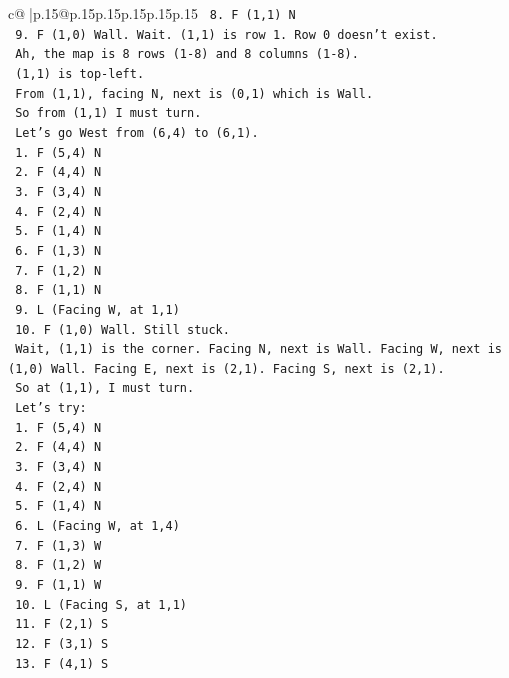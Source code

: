 \documentclass{article}
\begin{document}
{\begin{supertabular}{c@{$\;$}|p{.15\linewidth}@{}p{.15\linewidth}p{.15\linewidth}p{.15\linewidth}p{.15\linewidth}p{.15\linewidth}}
{{{\texttt{    8. F (1,1) N} \\
\texttt{    9. F (1,0) Wall. Wait. (1,1) is row 1. Row 0 doesn't exist.} \\
\texttt{    Ah, the map is 8 rows (1{-}8) and 8 columns (1{-}8).} \\
\texttt{    (1,1) is top{-}left.} \\
\texttt{    From (1,1), facing N, next is (0,1) which is Wall.} \\
\texttt{    So from (1,1) I must turn.} \\
\texttt{    Let's go West from (6,4) to (6,1).} \\
\texttt{    1. F (5,4) N} \\
\texttt{    2. F (4,4) N} \\
\texttt{    3. F (3,4) N} \\
\texttt{    4. F (2,4) N} \\
\texttt{    5. F (1,4) N} \\
\texttt{    6. F (1,3) N} \\
\texttt{    7. F (1,2) N} \\
\texttt{    8. F (1,1) N} \\
\texttt{    9. L (Facing W, at 1,1)} \\
\texttt{    10. F (1,0) Wall. Still stuck.} \\
\texttt{    Wait, (1,1) is the corner. Facing N, next is Wall. Facing W, next is (1,0) Wall. Facing E, next is (2,1). Facing S, next is (2,1).} \\
\texttt{    So at (1,1), I must turn.} \\
\texttt{    Let's try:} \\
\texttt{    1. F (5,4) N} \\
\texttt{    2. F (4,4) N} \\
\texttt{    3. F (3,4) N} \\
\texttt{    4. F (2,4) N} \\
\texttt{    5. F (1,4) N} \\
\texttt{    6. L (Facing W, at 1,4)} \\
\texttt{    7. F (1,3) W} \\
\texttt{    8. F (1,2) W} \\
\texttt{    9. F (1,1) W} \\
\texttt{    10. L (Facing S, at 1,1)} \\
\texttt{    11. F (2,1) S} \\
\texttt{    12. F (3,1) S} \\
\texttt{    13. F (4,1) S} \\
}}}
\end{supertabular}}
\end{document}
